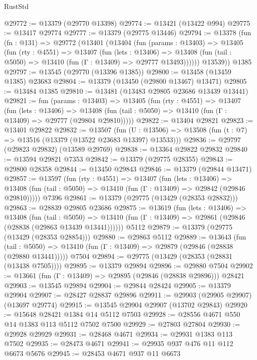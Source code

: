 \begin{lexlean}{RustStd}
\begin{coremodule}
@29772 := @13379 (@29770 @13398)
@29774 := @13421 (@13422 @994)
@29775 := @13417 @29774
@29777 := @13379 (@29775 @13446)
@29794 := @13378
    (fun (fn : @131) =>
    @29772
      (@13401
        (@13404
          (fun (params : @13403) =>
          @13405
            (fun (rty : @4551) =>
            @13407
              (fun (lets : @13406) =>
              @13408 (fun (tail : @5050) => @13410 (fun (Γ : @13409) => @29777 @13493))))))
        @13539))
    @1385
@29797 := @13545 (@29770 (@13396 @1385))
@29800 := @13458 (@13459 @1385) @23683
@29804 := @13379 (@13450 (@29800 @13467) @13471)
@29805 := @13484 @1385
@29810 := @13481 (@13483 @29805 @23686 @13439 @13441)
@29821 := fun (params : @13403) =>
  @13405
    (fun (rty : @4551) =>
    @13407
      (fun (lets : @13406) =>
      @13408 (fun (tail : @5050) => @13410 (fun (Γ : @13409) => @29777 (@29804 @29810)))))
@29822 := @13404 @29821
@29823 := @13401 @29822
@29832 := @13507
    (fun (U : @13506) => @13508 (fun (t : @7) => @13516 (@13379 (@13522 @23683 @13397) @13533)))
@29836 := @29797 (@29823 @29832) (@13589 @29769)
@29838 := @13364 @29822 @29832
@29840 := @13594 @29821 @7353
@29842 := @13379 (@29775 @28355)
@29843 := @29800 @28358
@29844 := @13450 @29843
@29846 := @13379 (@29844 @13471)
@29857 := @13597
    (fun (rty : @4551) =>
    @13407
      (fun (lets : @13406) =>
      @13408 (fun (tail : @5050) => @13410 (fun (Γ : @13409) => @29842 (@29846 @29810)))))
    @7396
@29861 := @13379 (@29775 (@13429 (@28353 @28832)))
@29863 := @28839 @29805 @23686
@29875 := @13619
    (fun (lets : @13406) =>
    @13408
      (fun (tail : @5050) =>
      @13410 (fun (Γ : @13409) => @29861 (@29846 (@28838 (@29863 @13439 @13441))))))
    @5112
@29879 := @13379 (@29775 (@13429 (@28353 @28854)))
@29880 := @29863 @5112
@29889 := @13643
    (fun (tail : @5050) => @13410 (fun (Γ : @13409) => @29879 (@29846 (@28838 (@29880 @13441)))))
    @7504
@29894 := @29775 (@13429 (@28353 (@28831 (@13438 @7505))))
@29895 := @13379 @29894
@29896 := @29880 @7504
@29902 := @13661 (fun (Γ : @13409) => @29895 (@29846 (@28838 @29896))) @28421
@29903 := @13545 @29894
@29904 := @29844 @28424
@29905 := @13379 @29904
@29907 := @28427 @28837 @29896
@29911 := @29903 (@29905 @29907) (@13697 @29774)
@29915 := @13545 @29904 @29907 (@13702 @29843)
@29920 := @15648 @28421 @1384 @14 @5112 @7503
@29928 := @28556 @4671 @550 @14 @1383 @113 @5112 @7502 @7500
@29929 := @27803 @27804
@29930 := @29928 @29929
@29931 := @28468 @4671
@29934 := @29931 @1383 @113 @7502
@29935 := @28473 @4671
@29941 := @29935 @937 @476 @11 @112 @6673 @5676
@29945 := @28453 @4671 @937 @11 @6673

\end{coremodule}
\end{lexlean}
